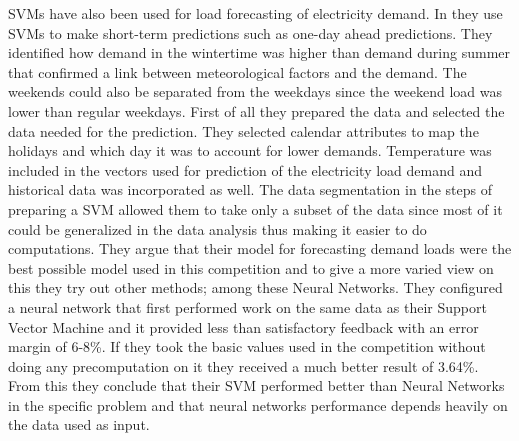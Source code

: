 SVMs have also been used for load forecasting of electricity demand. In \cite{chen2004load} they use SVMs to make short-term predictions such as one-day ahead predictions. They identified how demand in the wintertime was higher than demand during summer that confirmed a link between meteorological factors and the demand. The weekends could also be separated from the weekdays since the weekend load was lower than regular weekdays. First of all they prepared the data and selected the data needed for the prediction. They selected calendar attributes to map the holidays and which day it was to account for lower demands. Temperature was included in the vectors used for prediction of the electricity load demand and historical data was incorporated as well. The data segmentation in the steps of preparing a SVM allowed them to take only a subset of the data since most of it could be generalized in the data analysis thus making it easier to do computations. They argue that their model for forecasting demand loads were the best possible model used in this competition and to give a more varied view on this they try out other methods; among these Neural Networks. They configured a neural network that first performed work on the same data as their Support Vector Machine and it provided less than satisfactory feedback with an error margin of 6-8\%. If they took the basic values used in the competition without doing any precomputation on it they received a much better result of 3.64\%. From this they conclude that their SVM performed better than Neural Networks in the specific problem and that neural networks performance depends heavily on the data used as input.